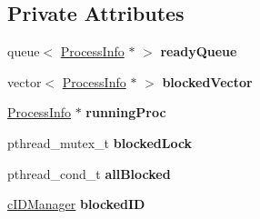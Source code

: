 \subsection*{\-Private \-Attributes}
\begin{DoxyCompactItemize}
\item 
\hypertarget{classcLottery_a7af883493eeee69d37d78f26d4f04dad}{queue$<$ \hyperlink{structProcessInfo}{\-Process\-Info} $\ast$ $>$ {\bfseries ready\-Queue}}\label{dd/dc8/classcLottery_a7af883493eeee69d37d78f26d4f04dad}

\item 
\hypertarget{classcLottery_a58409db56629d3aa331c17478f9d3dc0}{vector$<$ \hyperlink{structProcessInfo}{\-Process\-Info} $\ast$ $>$ {\bfseries blocked\-Vector}}\label{dd/dc8/classcLottery_a58409db56629d3aa331c17478f9d3dc0}

\item 
\hypertarget{classcLottery_aca8eb62eb83b54b0fccd68350a90d57c}{\hyperlink{structProcessInfo}{\-Process\-Info} $\ast$ {\bfseries running\-Proc}}\label{dd/dc8/classcLottery_aca8eb62eb83b54b0fccd68350a90d57c}

\item 
\hypertarget{classcLottery_a789086be59ccc718e10575c9b0d57ce6}{pthread\-\_\-mutex\-\_\-t {\bfseries blocked\-Lock}}\label{dd/dc8/classcLottery_a789086be59ccc718e10575c9b0d57ce6}

\item 
\hypertarget{classcLottery_a1af5754b5f4b4dd73c2052d14fb704d8}{pthread\-\_\-cond\-\_\-t {\bfseries all\-Blocked}}\label{dd/dc8/classcLottery_a1af5754b5f4b4dd73c2052d14fb704d8}

\item 
\hypertarget{classcLottery_a0150bb81cf13ebf1da2f95b5c5da964f}{\hyperlink{classcIDManager}{c\-I\-D\-Manager} {\bfseries blocked\-I\-D}}\label{dd/dc8/classcLottery_a0150bb81cf13ebf1da2f95b5c5da964f}

\end{DoxyCompactItemize}


